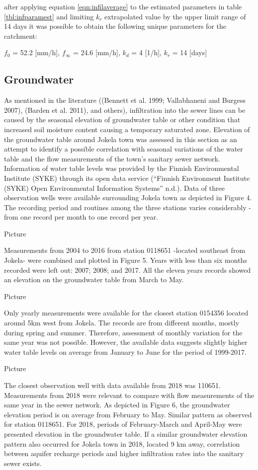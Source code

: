 after applying equation \ref{eqn:infilaverage} to the estimated parameters in table \ref{tbl:infparamest} and limiting $k_r$ extrapolated value by the upper limit range of 14 days it was possible to obtain the following unique parameters for the catchment:

$f_0$ = 52.2 [mm/h], $f_\infty$ = 24.6 [mm/h], $k_d$ = 4 [1/h], $k_r$ = 14 [days]


    \subsection{Groundwater}

As mentioned in the literature ((Bennett et al. 1999; Vallabhaneni and Burgess 2007), (Barden et al. 2011), and others), infiltration into the sewer lines can be caused by the seasonal elevation of groundwater table or other condition that increased soil moisture content causing a temporary saturated zone. Elevation of the groundwater table around Jokela town was assessed in this section as an attempt to identify a possible correlation with seasonal variations of the water table and the flow measurements of the town’s sanitary sewer network. 
Information of water table levels was provided by the Finnish Environmental Institute (SYKE) through its open data service (“Finnish Environment Institute (SYKE) Open Environmental Information Systems” n.d.). Data of three observation wells were available surrounding Jokela town as depicted in Figure 4. The recording period and routines among the three stations varies considerably - from one record per month to one record per year.

Picture

Measurements from 2004 to 2016 from station 0118651 -located southeast from Jokela- were combined and plotted in Figure 5. Years with less than six months recorded were left out: 2007; 2008; and 2017. All the eleven years records showed an elevation on the groundwater table from March to May. 

Picture

Only yearly measurements were available for the closest station 0154356 located around 5km west from Jokela. The records are from different months, mostly during spring and summer. Therefore, assessment of monthly variation for the same year was not possible. However, the available data suggests slightly higher water table levels on average from January to June for the period of 1999-2017.

Picture

The closest observation well with data available from 2018 was 110651. Measurements from 2018 were relevant to compare with flow measurements of the same year in the sewer network. As depicted in Figure 6, the groundwater elevation period is on average from February to May. Similar pattern as observed for station 0118651. For 2018, periods of February-March and April-May were presented elevation in the groundwater table. If a similar groundwater elevation pattern also occurred for Jokela town in 2018, located 9 km away, correlation between aquifer recharge periods and higher infiltration rates into the sanitary sewer exists. 
    
